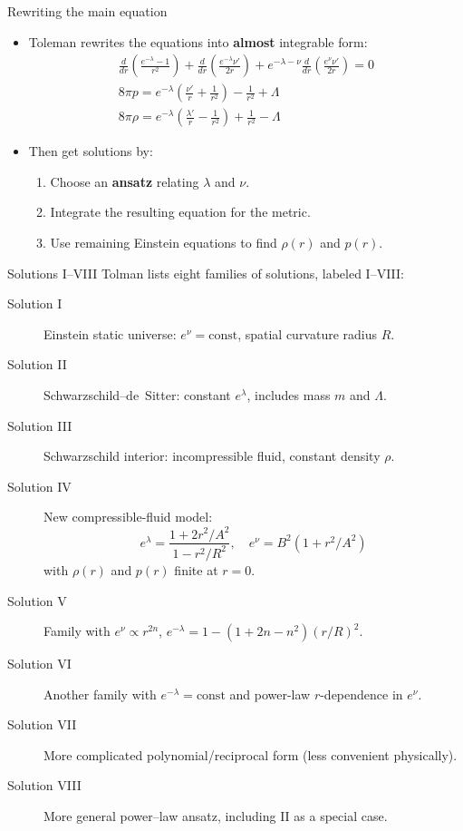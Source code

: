 \documentclass[11pt]{beamer}
\begin{document}
\begin{frame}{Rewriting the main equation}
  
  \begin{itemize}
      \item Toleman rewrites the equations into \textbf{almost} integrable form:
        \begin{align*}
          \frac{d}{dr}\!\left( \frac{e^{-\lambda} - 1}{r^2} \right)
          + \frac{d}{dr}\!\left( \frac{e^{-\lambda} \nu'}{2r} \right)
          + e^{-\lambda - \nu} \frac{d}{dr}\!\left( \frac{e^{\nu} \nu'}{2r} \right)
          = 0
          \\
          8\pi p
          = e^{-\lambda} \!\left( \frac{\nu'}{r} + \frac{1}{r^2} \right)
          - \frac{1}{r^2} + \Lambda
          \\
          8\pi \rho
          = e^{-\lambda} \!\left( \frac{\lambda'}{r} - \frac{1}{r^2} \right)
          + \frac{1}{r^2} - \Lambda
        \end{align*}
      \item Then get solutions by:
      \begin{enumerate}
        \item Choose an \textbf{ansatz} relating $\lambda$ and $\nu$.
        \item Integrate the resulting equation for the metric.
        \item Use remaining Einstein equations to find $\rho(r)$ and $p(r)$.
      \end{enumerate}
    \end{itemize}
\end{frame}

\begin{frame}{Solutions I–VIII}
  \small
  Tolman lists eight families of solutions, labeled I–VIII:
  \begin{description}
    \item[Solution I] Einstein static universe: $e^\nu = \text{const}$, spatial curvature radius $R$.
    \item[Solution II] Schwarzschild–de~Sitter: constant $e^\lambda$, includes mass $m$ and $\Lambda$.
    \item[Solution III] Schwarzschild interior: incompressible fluid, constant density $\rho$.
    \item[Solution IV] New compressible-fluid model:
      \[
        e^\lambda = \frac{1+2r^2/A^2}{1-r^2/R^2},\quad e^\nu = B^2(1+r^2/A^2)
      \]
      with $\rho(r)$ and $p(r)$ finite at $r=0$.
    \item[Solution V] Family with $e^\nu \propto r^{2n}$, $e^{-\lambda} = 1 - (1+2n-n^2)(r/R)^2$.
    \item[Solution VI] Another family with $e^{-\lambda} = \text{const}$ and power-law $r$-dependence in $e^\nu$.
    \item[Solution VII] More complicated polynomial/reciprocal form (less convenient physically).
    \item[Solution VIII] More general power–law ansatz, including II as a special case.
  \end{description}
\end{frame}
\end{document}
